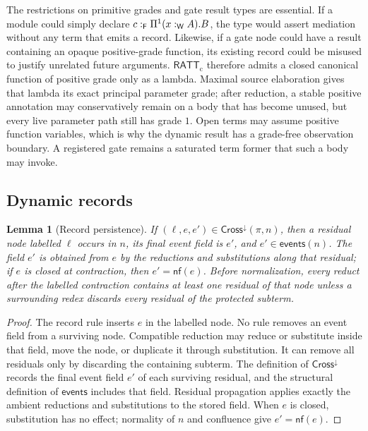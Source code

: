 \documentclass[11pt]{article}
\numberwithin{equation}{section}
\theoremstyle{definition}
\theoremstyle{plain}
\newtheorem{lemma}[definition]{Lemma}
\theoremstyle{remark}
\newcommand{\RATT}{\mathsf{RATT}_{\mathrm c}}
\newcommand{\Frm}{\mathsf F}
\newcommand{\Wit}{\mathsf W}
\newcommand{\events}{\mathsf{events}}
\newcommand{\nf}{\mathsf{nf}}
\newcommand{\cross}{\mathsf{Cross}}
\begin{document}
The restrictions on primitive grades and gate result types are essential.  If
a module could simply declare \(c:_{\Frm}\AFDepFun^1(x:_{\Wit}A).B\), the type would
assert mediation without any term that emits a record.  Likewise, if a gate
node could have a result containing an opaque positive-grade function, its
existing record could be misused to justify unrelated future arguments.
\(\RATT\) therefore admits a closed canonical function of positive grade only
as a lambda.  Maximal source elaboration gives that lambda its exact principal
parameter grade; after reduction, a stable positive annotation may conservatively
remain on a body that has become unused, but every live parameter path still
has grade \(1\).  Open terms may assume positive function variables, which is
why the dynamic result has a grade-free observation boundary.  A registered
gate remains a saturated term former that such a body may invoke.

\subsection{Dynamic records}

\begin{lemma}[Record persistence]\label{lem:record}
If \((\ell,e,e')\in\cross^\downarrow(\pi,n)\), then a residual node labelled
\(\ell\) occurs in \(n\), its final event field is \(e'\), and
\(e'\in\events(n)\).  The field \(e'\) is obtained from \(e\) by the reductions
and substitutions along that residual; if \(e\) is closed at contraction, then
\(e'=\nf(e)\).  Before normalization, every reduct after the labelled
contraction contains at least one residual of that node unless a surrounding
redex discards every residual of the protected subterm.
\end{lemma}

\begin{proof}
The record rule inserts \(e\) in the labelled node.  No rule removes an event
field from a surviving node.  Compatible reduction may reduce or substitute
inside that field, move the node, or duplicate it through substitution.  It
can remove all residuals only by discarding the containing subterm.  The
definition of \(\cross^\downarrow\) records the final event field \(e'\) of
each surviving residual, and the structural definition of \(\events\) includes
that field.  Residual propagation applies exactly the ambient reductions and
substitutions to the stored field.  When \(e\) is closed, substitution has no
effect; normality of \(n\) and confluence give \(e'=\nf(e)\).
\end{proof}
\end{document}
